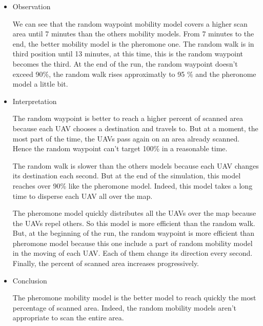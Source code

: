 \begin{itemize}

\item Observation

We can see that the random waypoint mobility model covers a higher scan area until 7 minutes than the others mobility models. From 7 minutes to the end, the better mobility model is the pheromone one. The random walk is in third position until 13 minutes, at this time, this is the random waypoint becomes the third. At the end of the run, the random waypoint doesn't exceed 90\%, the random walk rises approximatly to 95 \% and the pheronome model a little bit.

\item Interpretation

The random waypoint is better to reach a higher percent of scanned area because each UAV chooses a destination and travels to. But at a moment, the most part of the time, the UAVs pass again on an area already scanned. Hence the random waypoint can't target 100\% in a reasonable time.

The random walk is slower than the others models because each UAV changes its destination each second. But at the end of the simulation, this model reaches over 90\% like the pheromone model. Indeed, this model takes a long time to disperse each UAV all over the map.

The pheromone model quickly distributes all the UAVs over the map because the UAVs repel others. So this model is more efficient than the random walk. But, at the beginning of the run, the random waypoint is more efficient than pheromone model because this one include a part of random mobility model in the moving of each UAV. Each of them change its direction every second. Finally, the percent of scanned area increases progressively.

\item Conclusion

The pheromone mobility model is the better model to reach quickly the most percentage of scanned area. Indeed, the random mobility models aren't appropriate to scan the entire area.

\end{itemize}